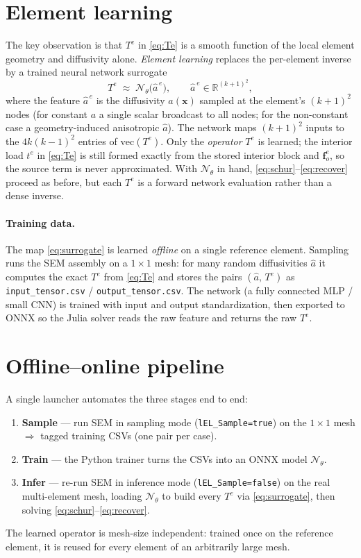 \documentclass[11pt]{article}
\newcommand{\ff}{\mathbf{f}}
\begin{document}
\section{Element learning}
The key observation is that $T^e$ in \eqref{eq:Te} is a smooth function of the local
element geometry and diffusivity alone. \emph{Element learning} replaces the per-element
inverse by a trained neural network surrogate
\begin{equation}
  T^e \;\approx\; \mathcal{N}_\theta\!\big(\hat a^{\,e}\big),
  \qquad
  \hat a^{\,e}\in\mathbb{R}^{(k+1)^2},
  \label{eq:surrogate}
\end{equation}
where the feature $\hat a^{\,e}$ is the diffusivity $a(\mathbf{x})$ sampled at the
element's $(k{+}1)^2$ nodes (for constant $a$ a single scalar broadcast to all nodes;
for the non-constant case a geometry-induced anisotropic $\hat a$). The network maps
$(k{+}1)^2$ inputs to the $4k(k{-}1)^2$ entries of $\mathrm{vec}(T^e)$. Only the
\emph{operator} $T^e$ is learned; the interior load $t^e$ in \eqref{eq:Te} is still formed
exactly from the stored interior block and $\ff^e_o$, so the source term is never
approximated. With $\mathcal{N}_\theta$ in hand, \eqref{eq:schur}--\eqref{eq:recover}
proceed as before, but each $T^e$ is a forward network evaluation rather than a dense
inverse.

\paragraph{Training data.} The map \eqref{eq:surrogate} is learned \emph{offline} on a
single reference element. Sampling runs the SEM assembly on a $1\times1$ mesh: for many
random diffusivities $\hat a$ it computes the exact $T^e$ from \eqref{eq:Te} and stores the
pairs $(\hat a,\,T^e)$ as \texttt{input\_tensor.csv} / \texttt{output\_tensor.csv}. The
network (a fully connected MLP / small CNN) is trained with input and output
standardization, then exported to ONNX so the Julia solver reads the raw feature and
returns the raw $T^e$.

\section{Offline--online pipeline}
A single launcher automates the three stages end to end:
\begin{enumerate}\itemsep2pt
  \item \textbf{Sample} --- run SEM in sampling mode (\texttt{lEL\_Sample=true}) on the
        $1\times1$ mesh $\Rightarrow$ tagged training CSVs (one pair per case).
  \item \textbf{Train} --- the Python trainer turns the CSVs into an ONNX model
        $\mathcal{N}_\theta$.
  \item \textbf{Infer} --- re-run SEM in inference mode (\texttt{lEL\_Sample=false}) on the
        real multi-element mesh, loading $\mathcal{N}_\theta$ to build every $T^e$ via
        \eqref{eq:surrogate}, then solving \eqref{eq:schur}--\eqref{eq:recover}.
\end{enumerate}
The learned operator is mesh-size independent: trained once on the reference element, it
is reused for every element of an arbitrarily large mesh.
\end{document}
